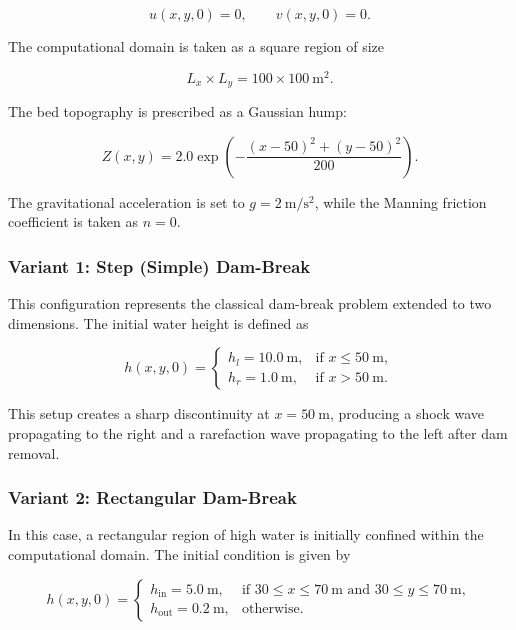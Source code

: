 \documentclass[12pt]{article}
\begin{document}
\begin{equation}
u(x,y,0)=0,
\qquad
v(x,y,0)=0.
\end{equation}

The computational domain is taken as a square region of size

\begin{equation}
L_x \times L_y =100\times100~\mathrm{m}^2.
\end{equation}

The bed topography is prescribed as a Gaussian hump:

\begin{equation}
Z(x,y)=2.0\exp\left(
-\frac{(x-50)^2+(y-50)^2}{200}
\right).
\end{equation}

The gravitational acceleration is set to $g=2~\mathrm{m/s^2}$, while the Manning friction coefficient is taken as $n=0$.

\subsubsection{Variant 1: Step (Simple) Dam-Break}

This configuration represents the classical dam-break problem extended to two dimensions. The initial water height is defined as

\begin{equation}
h(x,y,0)=
\begin{cases}
h_l=10.0~\mathrm{m}, & \text{if } x\leq 50~\mathrm{m},\\
h_r=1.0~\mathrm{m}, & \text{if } x>50~\mathrm{m}.
\end{cases}
\end{equation}

This setup creates a sharp discontinuity at $x=50~\mathrm{m}$, producing a shock wave propagating to the right and a rarefaction wave propagating to the left after dam removal.

\subsubsection{Variant 2: Rectangular Dam-Break}

In this case, a rectangular region of high water is initially confined within the computational domain. The initial condition is given by

\begin{equation}
h(x,y,0)=
\begin{cases}
h_{\mathrm{in}}=5.0~\mathrm{m},
& \text{if } 30\leq x\leq70~\mathrm{m}
\text{ and }30\leq y\leq70~\mathrm{m},\\
h_{\mathrm{out}}=0.2~\mathrm{m},
& \text{otherwise}.
\end{cases}
\end{equation}
\end{document}
